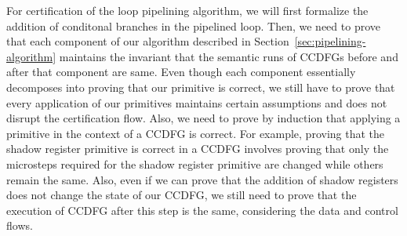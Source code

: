 For certification of the loop pipelining algorithm, we will first formalize the addition of conditonal branches in the pipelined loop. Then, we need to prove that each component of our algorithm described in Section~\ref{sec:pipelining-algorithm} maintains the invariant that the semantic runs of CCDFGs before and after that component are same. Even though each component essentially decomposes into proving that our primitive is correct, we still have to prove that every application of our primitives maintains certain assumptions and does not disrupt the certification flow. Also, we need to prove by induction that applying a primitive in the context of a CCDFG is correct. For example, proving that the shadow register primitive is correct in a CCDFG involves proving that only the microsteps required for the shadow register primitive are changed while others remain the same. Also, even if we can prove that the addition of shadow registers does not change the state of our CCDFG, we still need to prove that the execution of CCDFG after this step is the same, considering the data and control flows.



